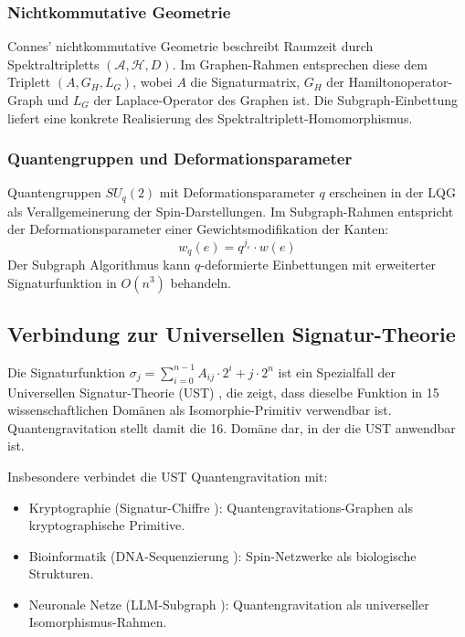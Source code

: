﻿\documentclass[a4paper,12pt]{article}
\theoremstyle{definition}
\begin{document}
\subsubsection{Nichtkommutative Geometrie}

Connes' nichtkommutative Geometrie \cite{connes1994} beschreibt
Raumzeit durch Spektraltripletts $(\mathcal{A}, \mathcal{H}, D)$.
Im Graphen-Rahmen entsprechen diese dem Triplett $(A, G_H, L_G)$,
wobei $A$ die Signaturmatrix, $G_H$ der Hamiltonoperator-Graph und
$L_G$ der Laplace-Operator des Graphen ist. Die Subgraph-Einbettung
liefert eine konkrete Realisierung des Spektraltriplett-Homomorphismus.

\subsubsection{Quantengruppen und Deformationsparameter}

Quantengruppen $SU_q(2)$ mit Deformationsparameter $q$ erscheinen
in der LQG als Verallgemeinerung der Spin-Darstellungen.
Im Subgraph-Rahmen entspricht der Deformationsparameter einer
Gewichtsmodifikation der Kanten:
\[
w_q(e) = q^{j_e} \cdot w(e)
\]
Der Subgraph Algorithmus kann $q$-deformierte Einbettungen mit
erweiterter Signaturfunktion in $O(n^3)$ behandeln.

\subsection{Verbindung zur Universellen Signatur-Theorie}

Die Signaturfunktion $\sigma_j = \sum_{i=0}^{n-1} A_{ij} \cdot 2^i + j \cdot 2^n$
ist ein Spezialfall der Universellen Signatur-Theorie (UST)
\cite{epp2026ust}, die zeigt, dass dieselbe Funktion in 15
wissenschaftlichen Domänen als Isomorphie-Primitiv verwendbar ist.
Quantengravitation stellt damit die 16. Domäne dar, in der die
UST anwendbar ist.

Insbesondere verbindet die UST Quantengravitation mit:
\begin{itemize}
	\item Kryptographie (Signatur-Chiffre \cite{epp2026sigchiffre}):
	      Quantengravitations-Graphen als kryptographische Primitive.
	\item Bioinformatik (DNA-Sequenzierung \cite{epp2026dna}):
	      Spin-Netzwerke als biologische Strukturen.
	\item Neuronale Netze (LLM-Subgraph \cite{epp2026llm}):
	      Quantengravitation als universeller Isomorphismus-Rahmen.
\end{itemize}
\end{document}

